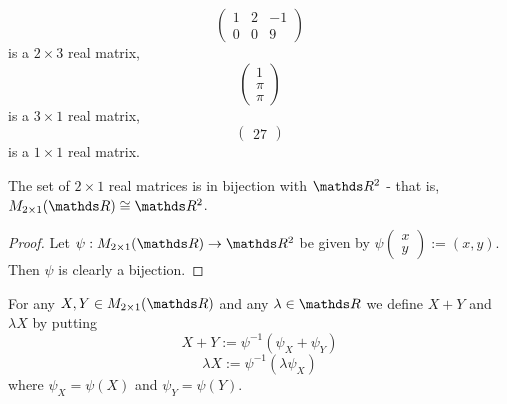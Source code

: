\begin{ex}
	\[\begin{pmatrix}
	1 & 2 & -1\\
	0 & 0 & 9
	\end{pmatrix}\] is a $2\times 3$ real matrix,\[\begin{pmatrix}
	1\\
	\pi\\
	\pi
	\end{pmatrix}\]is a $3\times 1$ real matrix,\[\begin{pmatrix}
	27
	\end{pmatrix}\]is a $1\times 1$ real matrix.
\end{ex}

\begin{prop}
	The set of $2\times 1$ real matrices is in bijection with $\R^2$ - that is, $M_{2\times 1}(\R)\iso\R^2$.
\end{prop}
\begin{proof}
	Let $\psi:M_{2\times 1}(\R)\to\R^2$ be given by $\psi\begin{pmatrix}
	x\\y
	\end{pmatrix}:=(x,y)$. Then $\psi$ is clearly a bijection.
\end{proof}

\begin{df}
	For any $X,Y\in M_{2\times 1}(\R)$ and any $\lambda \in \R$ we define $X+Y$ and $\lambda X$ by putting
	\[X+Y:=\psi^{-1}(\psi_X+\psi_Y)\]
	\[\lambda X:=\psi^{-1}(\lambda\psi_X)\]where $\psi_X=\psi(X)$ and $\psi_Y=\psi(Y)$.
\end{df}

